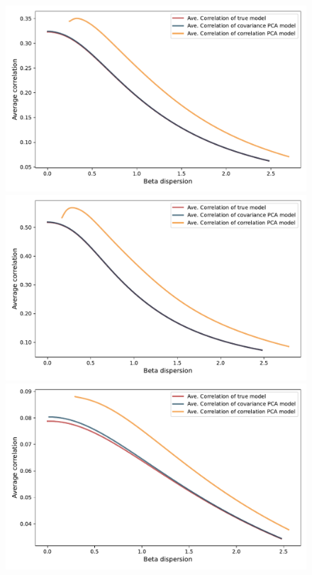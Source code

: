 \documentclass[leqno,12pt]{article}
\begin{document}
{\begin{figure}[htp]
\begin{center}
  \includegraphics[scale=0.33]{img/DispersionvsCorrelation1factorsN512T256fvol16minsvol10maxsvol40}
  \includegraphics[scale=0.33]{img/DispersionvsCorrelation1factorsN512T256fvol25minsvol10maxsvol40}
  \includegraphics[scale=0.33]{img/DispersionvsCorrelation1factorsN512T256fvol16minsvol30maxsvol90}

\end{center}
\end{figure}}
\end{document}
